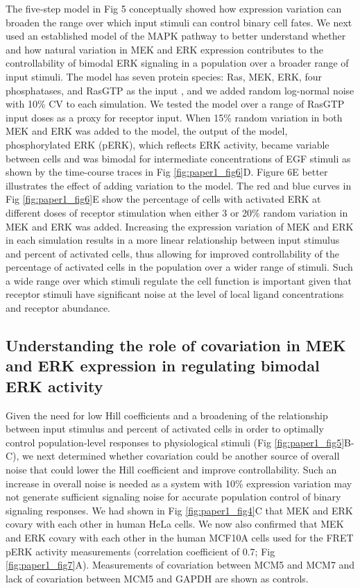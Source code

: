 The five‐step model in Fig 5 conceptually showed how expression variation can broaden the range over which input stimuli can control binary cell fates. We next used an established model of the MAPK pathway to better understand whether and how natural variation in MEK and ERK expression contributes to the controllability of bimodal ERK signaling in a population over a broader range of input stimuli. The model has seven protein species: Ras, MEK, ERK, four phosphatases, and RasGTP as the input \cite{Sturm2010}, and we added random log-normal noise with 10\% CV to each simulation. We tested the model over a range of RasGTP input doses as a proxy for receptor input. When 15\% random variation in both MEK and ERK was added to the model, the output of the model, phosphorylated ERK (pERK), which reflects ERK activity, became variable between cells and was bimodal for intermediate concentrations of EGF stimuli as shown by the time-course traces in Fig \ref{fig:paper1_fig6}D. Figure 6E better illustrates the effect of adding variation to the model. The red and blue curves in Fig \ref{fig:paper1_fig6}E show the percentage of cells with activated ERK at different doses of receptor stimulation when either 3 or 20\% random variation in MEK and ERK was added. Increasing the expression variation of MEK and ERK in each simulation results in a more linear relationship between input stimulus and percent of activated cells, thus allowing for improved controllability of the percentage of activated cells in the population over a wider range of stimuli. Such a wide range over which stimuli regulate the cell function is important given that receptor stimuli have significant noise at the level of local ligand concentrations and receptor abundance.

\subsection{Understanding the role of covariation in MEK and ERK expression in regulating bimodal ERK activity}

Given the need for low Hill coefficients and a broadening of the relationship between input stimulus and percent of activated cells in order to optimally control population‐level responses to physiological stimuli (Fig \ref{fig:paper1_fig5}B-C), we next determined whether covariation could be another source of overall noise that could lower the Hill coefficient and improve controllability. Such an increase in overall noise is needed as a system with 10\% expression variation may not generate sufficient signaling noise for accurate population control of binary signaling responses. We had shown in Fig \ref{fig:paper1_fig4}C that MEK and ERK covary with each other in human HeLa cells. We now also confirmed that MEK and ERK covary with each other in the human MCF10A cells used for the FRET pERK activity measurements (correlation coefficient of 0.7; Fig \ref{fig:paper1_fig7}A). Measurements of covariation between MCM5 and MCM7 and lack of covariation between MCM5 and GAPDH are shown as controls.

